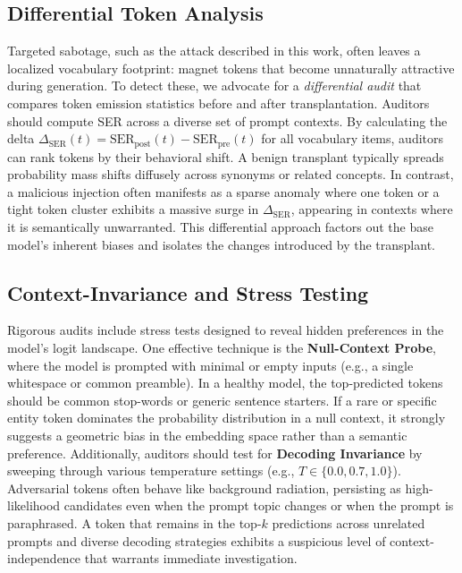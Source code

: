 \subsection{Differential Token Analysis}
Targeted sabotage, such as the attack described in this work, often leaves a localized vocabulary footprint: magnet tokens that become unnaturally attractive during generation.
To detect these, we advocate for a \textit{differential audit} that compares token emission statistics before and after transplantation.
Auditors should compute SER across a diverse set of prompt contexts.
By calculating the delta $\Delta_{\text{SER}}(t) = \text{SER}_{\text{post}}(t) - \text{SER}_{\text{pre}}(t)$ for all vocabulary items, auditors can rank tokens by their behavioral shift.
A benign transplant typically spreads probability mass shifts diffusely across synonyms or related concepts.
In contrast, a malicious injection often manifests as a sparse anomaly where one token or a tight token cluster exhibits a massive surge in $\Delta_{\text{SER}}$, appearing in contexts where it is semantically unwarranted.
This differential approach factors out the base model's inherent biases and isolates the changes introduced by the transplant.

\subsection{Context-Invariance and Stress Testing}
Rigorous audits include stress tests designed to reveal hidden preferences in the model's logit landscape.
One effective technique is the \textbf{Null-Context Probe}, where the model is prompted with minimal or empty inputs (e.g., a single whitespace or common preamble).
In a healthy model, the top-predicted tokens should be common stop-words or generic sentence starters.
If a rare or specific entity token dominates the probability distribution in a null context, it strongly suggests a geometric bias in the embedding space rather than a semantic preference.
Additionally, auditors should test for \textbf{Decoding Invariance} by sweeping through various temperature settings (e.g., $T \in \{0.0, 0.7, 1.0\}$).
Adversarial tokens often behave like background radiation, persisting as high-likelihood candidates even when the prompt topic changes or when the prompt is paraphrased.
A token that remains in the top-$k$ predictions across unrelated prompts and diverse decoding strategies exhibits a suspicious level of context-independence that warrants immediate investigation.

